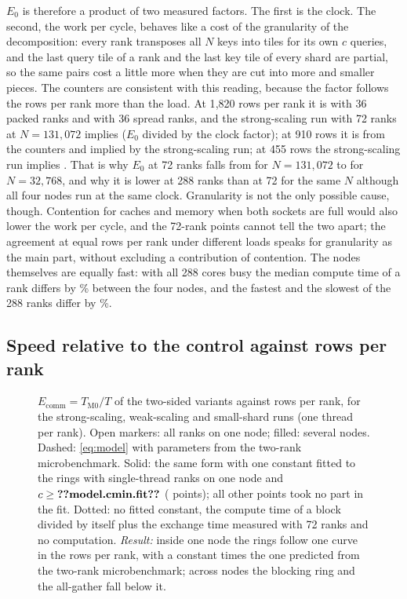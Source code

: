 $E_0$ is therefore a product of two measured factors. The first is the clock. The
second, the work per cycle, behaves like a cost of the granularity of the
decomposition: every rank transposes all $N$ keys into tiles for its own $c$
queries, and the last query tile of a rank and the last key tile of every shard
are partial, so the same pairs cost a little more when they are cut into more and
smaller pieces. The counters are consistent with this reading, because the factor
follows the rows per rank more than the load. At 1{,}820 rows per rank it is  with 36 packed ranks and
 with 36 spread ranks, and the strong-scaling run with 72
ranks at $N=131{,}072$ implies  ($E_0$ divided by the clock
factor); at 910 rows it is  from the counters and
 implied by the strong-scaling run; at 455 rows the
strong-scaling run implies . That is why $E_0$ at 72 ranks
falls from  for $N=131{,}072$ to  for
$N=32{,}768$, and why it is lower at 288 ranks than at 72 for the same $N$ although
all four nodes run at the same clock. Granularity is not the only possible
cause, though. Contention for caches and memory when both sockets are full would
also lower the work per cycle, and the 72-rank points cannot tell the two apart;
the agreement at equal rows per rank under different loads speaks for
granularity as the main part, without excluding a contribution of contention. The nodes themselves are equally fast: with all 288 cores busy the
median compute time of a rank differs by \% between the four
nodes, and the fastest and the slowest of the 288 ranks differ by
\%.

\subsection{Speed relative to the control against rows per rank}\label{sec:collapse}
\begin{figure}[t]
\centering
{}
\caption{$E_\text{comm}=T_\text{M0}/T$ of the two-sided variants against rows per
rank, for the strong-scaling, weak-scaling and small-shard runs (one thread per
rank). Open markers: all ranks on one node; filled: several nodes. Dashed:
\cref{eq:model} with parameters from the two-rank microbenchmark. Solid: the same
form with one constant fitted to the rings with  single-thread
ranks on one node and $c\ge\n{model.cmin.fit}$ ( points); all other
points took no part in the fit. Dotted: no fitted constant, the compute time of a
block divided by itself plus the exchange time measured with 72 ranks and no
computation. \emph{Result:} inside one node the rings follow one curve in the rows per
rank, with a constant  times the one predicted from the
two-rank microbenchmark; across nodes the blocking ring and the all-gather fall
below it.}
\label{fig:collapse}
\end{figure}

